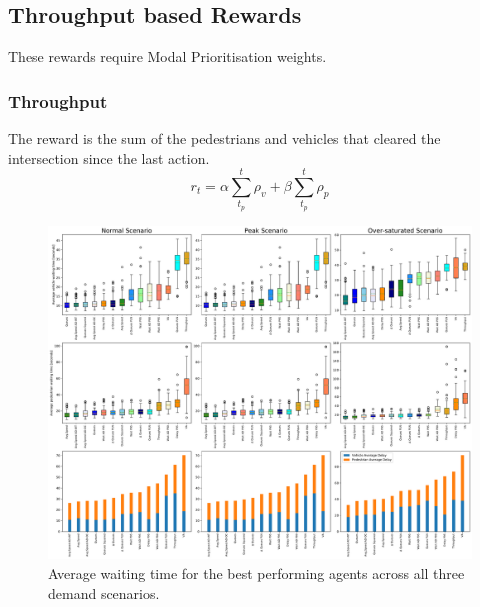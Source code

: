 \documentclass[conference]{IEEEtran}
\begin{document}
\subsection{Throughput based Rewards}
These rewards require Modal Prioritisation weights.
\subsubsection{Throughput}
The reward is the sum of the pedestrians and vehicles that cleared the intersection since the last action.
\begin{equation}
    r_t = \alpha \sum_{t_p}^t \rho_v + \beta \sum_{t_p}^t \rho_p
\label{eq:throughput}
\end{equation}
\begin{figure}                                                
\centering                                                    
\includegraphics[width=\textwidth]{9grid_ordered_boxplot_all.pdf}                                    
\caption{Average waiting time for the best performing agents across all three demand scenarios.}                                  
\label{fig:results_9_grid}                                               
\end{figure}
\end{document}

